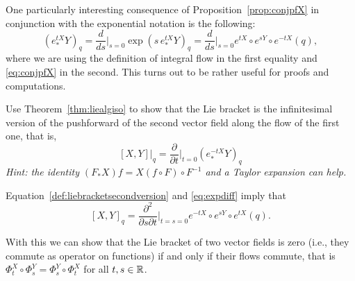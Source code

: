 \begin{remark}
  One particularly interesting consequence of Proposition~\ref{prop:conjpfX} in conjunction with the exponential notation is the following:
  \begin{equation}\label{eq:expdiff}
    \left(e_*^{tX} Y\right)_q =
    \frac{d}{ds}\Big|_{s=0} \exp\left(s\, e_*^{tX} Y\right)_q =
    \frac{d}{ds}\Big|_{s=0} e^{tX}\circ e^{sY}\circ e^{-t X}(q),
  \end{equation}
  where we are using the definition of integral flow in the first equality and \eqref{eq:conjpfX} in the second.
  This turns out to be rather useful for proofs and computations.  
\end{remark}

\begin{exercise}
  Use Theorem~\ref{thm:liealgiso} to show that the Lie bracket is the infinitesimal version of the pushforward of the second vector field along the flow of the first one, that is,
  \begin{equation}\label{def:liebracketsecondversion}
    [X,Y]\big|_q = \frac{\partial}{\partial t}\Big|_{t=0} (e_*^{-t X} Y)_q
  \end{equation}
 \textit{\small Hint: the identity $(F_* X)f = X(f\circ F)\circ F^{-1}$ and a Taylor expansion can help.}
\end{exercise}

\begin{remark}
  Equation~\eqref{def:liebracketsecondversion} and \eqref{eq:expdiff} imply that
  \begin{equation}\label{eq:lbddr}
    [X,Y]_q = \frac{\partial^2}{\partial s \partial t}\Big|_{t=s=0}e^{-tX}\circ e^{sY}\circ e^{t X}(q).
  \end{equation}
\end{remark}

With this we can show that the Lie bracket of two vector fields is zero (i.e., they commute as operator on functions) if and only if their flows commute, that is $\Phi^X_t \circ \Phi^Y_s = \Phi^Y_s\circ \Phi^X_t$ for all $t,s\in\mathbb{R}$.

